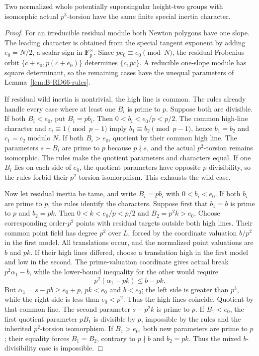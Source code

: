 \begin{proposition}
\label{prop:B-RD66-nonsquare}
Two normalized whole potentially supersingular height-two groups
with isomorphic actual $p^3$-torsion have the same finite special
inertia character.
\end{proposition}
\begin{proof}
For an irreducible residual module both Newton polygons have one
slope. The leading character is obtained from the special tangent
exponent by adding $e_0=N/2$, a scalar sign in $\mathbf F_p^\times$.
Since $pe_0\equiv e_0\pmod N$, the residual Frobenius orbit
$\{c+e_0,p(c+e_0)\}$ determines $\{c,pc\}$.
A reducible one-slope module has square determinant, so the remaining
cases have the unequal parameters of Lemma~\ref{lem:B-RD66-rules}.

If residual wild inertia is nontrivial, the high line is common.
The rules already handle every case where at least one $B_i$ is
prime to $p$. Suppose both are divisible. If both $B_i<e_0$, put
$B_i=pb_i$. Then $0<b_i<e_0/p<p/2$. The common high-line character
and $c_i\equiv1\pmod{p-1}$ imply
$b_1\equiv b_2\pmod{p-1}$, hence $b_1=b_2$ and $c_1=c_2$ modulo $N$.
If both $B_i>e_0$, quotient by their common high line. The parameters
$s-B_i$ are prime to $p$ because $p\nmid s$, and the actual
$p^2$-torsion remains isomorphic. The rules make the quotient
parameters and characters equal. If one $B_i$ lies on each side
of $e_0$, the quotient parameters have opposite $p$-divisibility,
so the rules forbid their $p^2$-torsion isomorphism. This exhausts
the wild case.

Now let residual inertia be tame, and write $B_i=pb_i$ with
$0<b_i<e_0$. If both $b_i$ are prime to $p$, the rules identify the
characters. Suppose first that $b_1=b$ is prime to $p$ and
$b_2=pk$. Then $0<k<e_0/p<p/2$ and $B_2=p^2k>e_0$.
Choose corresponding order-$p^2$ points with residual targets
outside both high lines. Their common point field has degree $p^2$
over $L$, forced by the coordinate valuation $b/p^2$ in the first
model. All translations occur, and the normalized point valuations
are $b$ and $pk$.
If their high lines differed, choose a translation high in the first
model and low in the second. The prime-valuation coordinate gives
actual break $p^2\alpha_1-b$, while the lower-bound inequality for
the other would require
\[
                  p^2(\alpha_1-pk)\le b-pk.            \tag{B-RD66.6}
\]
But $\alpha_1=s-pb\ge e_0+p$, $pk<e_0$ and $b<e_0$;
the left side is greater than $p^3$, while the right side is less
than $e_0<p^2$. Thus the high lines coincide.
Quotient by that common line. The second parameter $s-p^2k$ is
prime to $p$. If $B_1<e_0$, the first quotient parameter $pB_1$
is divisible by $p$, impossible by the rules and the inherited
$p^2$-torsion isomorphism. If $B_1>e_0$, both new parameters are
prime to $p$; their equality forces $B_1=B_2$, contrary to
$p\nmid b$ and $b_2=pk$. Thus the mixed $b$-divisibility case is
impossible.


\end{proof}
